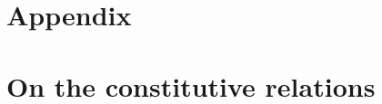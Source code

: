 \documentclass[11pt]{article}
\begin{document}
\bigskip





\appendix
\section*{Appendix}


\section{On the constitutive relations}\label{s:thermo}
\end{document}
